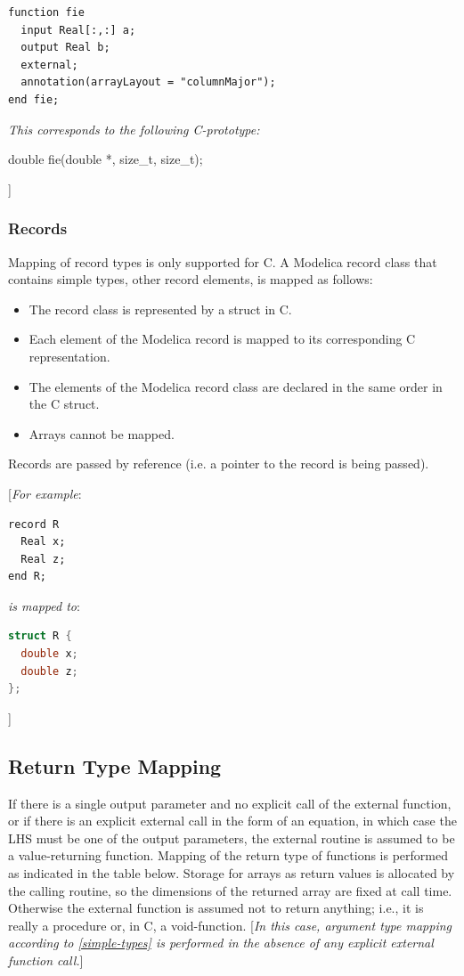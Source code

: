 \documentclass[10pt,a4paper]{report}
\def\doublelabel#1{\label{#1}\hypertarget{#1}{}}
\begin{document}
\begin{lstlisting}[language=modelica]
function fie
  input Real[:,:] a;
  output Real b;
  external;
  annotation(arrayLayout = "columnMajor");
end fie;
\end{lstlisting}
\emph{This corresponds to the following C-prototype:}

double fie(double *, size\_t, size\_t);

{]}

\subsubsection{Records}\doublelabel{records}

Mapping of record types is only supported for C. A Modelica record class
that contains simple types, other record elements, is mapped as follows:

\begin{itemize}
\item
  The record class is represented by a struct in C.
\item
  Each element of the Modelica record is mapped to its corresponding C
  representation.
\item
  The elements of the Modelica record class are declared in the same
  order in the C struct.
\item
  Arrays cannot be mapped.
\end{itemize}

Records are passed by reference (i.e. a pointer to the record is being
passed).

{[}\emph{For example}:

\begin{lstlisting}[language=modelica]
record R
  Real x;
  Real z;
end R;
\end{lstlisting}
\emph{is mapped to}:
\begin{lstlisting}[language=C]
struct R {
  double x;
  double z;
};
\end{lstlisting}

{]}

\subsection{Return Type Mapping}\doublelabel{return-type-mapping}

If there is a single output parameter and no explicit call of the
external function, or if there is an explicit external call in the form
of an equation, in which case the LHS must be one of the output
parameters, the external routine is assumed to be a value-returning
function. Mapping of the return type of functions is performed as
indicated in the table below. Storage for arrays as return values is
allocated by the calling routine, so the dimensions of the returned
array are fixed at call time. Otherwise the external function is assumed
not to return anything; i.e., it is really a procedure or, in C, a
void-function. {[}\emph{In this case, argument type mapping according to
\ref{simple-types} is performed in the absence of any explicit
external function call.}{]}
\end{document}
